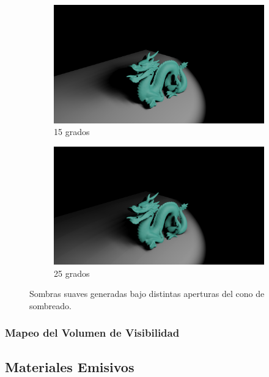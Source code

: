 \begin{figure}[H]
	\centering
	\begin{subfigure}[b]{.49\linewidth}
		\centering
		\captionsetup{justification=centering}
		\caption*{15 grados}
		\includegraphics[width=\linewidth]{media/finals/shadow_15.png}
	\end{subfigure}%
	\hspace{0.01\textwidth}
	\begin{subfigure}[b]{.49\linewidth}
		\centering
		\captionsetup{justification=centering}
		\caption*{25 grados}
		\includegraphics[width=\linewidth]{media/finals/shadow_25.png}
	\end{subfigure}%
	\caption{Sombras suaves generadas bajo distintas aperturas del cono de sombreado.}
	\label{fig:soft_aperture}
\end{figure}

\subsubsection{Mapeo del Volumen de Visibilidad}


\subsection{Materiales Emisivos}

